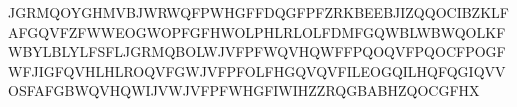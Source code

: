 JGRMQOYGHMVBJWRWQFPWHGFFDQGFPFZRKBEEBJIZQQOCIBZKLFAFGQVFZFWWEOGWOPFGFHWOLPHLRLOLFDMFGQWBLWBWQOLKFWBYLBLYLFSFLJGRMQBOLWJVFPFWQVHQWFFPQOQVFPQOCFPOGFWFJIGFQVHLHLROQVFGWJVFPFOLFHGQVQVFILEOGQILHQFQGIQVVOSFAFGBWQVHQWIJVWJVFPFWHGFIWIHZZRQGBABHZQOCGFHX 
